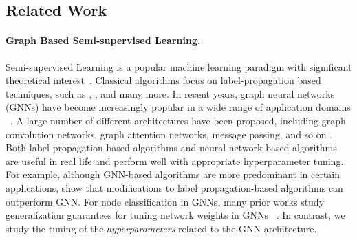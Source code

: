 \subsection{Related Work}
\paragraph{Graph Based Semi-supervised Learning.} Semi-supervised Learning is a popular machine learning paradigm with significant theoretical interest~\citep{zhou2003learning,delalleau2005efficient,garg2020generaliz}. Classical algorithms focus on label-propagation based techniques, such as \citet{zhou2003learning}, \citet{zhu2003semi}, and many more. 
In recent years, graph neural networks (GNNs) have become increasingly popular in a wide range of application domains
~\citep{kipf2016semi,velivckovic2017graph,iscen2019label}.
A large number of different architectures have been proposed, including graph convolution networks, graph attention networks, message passing, and so on \citep{dwivedi2023benchmarking}. 
Both label propagation-based algorithms and neural network-based algorithms are useful in real life and perform  well with appropriate hyperparameter tuning. For example, although GNN-based algorithms are more predominant in certain applications, \cite{huang2020combininglabelpropagationsimple} show that modifications to label propagation-based algorithms can outperform GNN. For node classification in GNNs, many prior works study generalization guarantees for tuning network weights in GNNs ~\citep{oono2021optimizationgeneralizationanalysistransduction, esser2021learningtheorysometimesexplain, tang2023understandinggeneralizationgraphneural}. In contrast, we study the tuning of the \textit{hyperparameters} related to the GNN architecture. 


